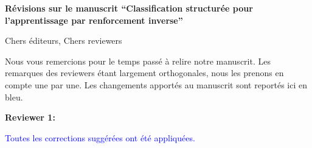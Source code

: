\documentclass[11pt, a4paper]{letter}
\begin{document}

\color{blue}

\address{Edouard Klein,  Matthieu Geist, \\Bilal Piot, Olivier Pietquin \\ IMS – MaLIS Research Group, Sup\'elec \\ 2 rue Edouard Belin, 57070 Metz (France)}
\date{Metz, \today. \vspace{1.5cm}}



\begin{letter}{\large \textbf{Révisions sur le manuscrit ``Classification structurée pour l'apprentissage par renforcement inverse''}}
\bigskip
\opening{Chers éditeurs, Chers reviewers}

\bigskip

Nous vous remercions pour le temps passé à relire notre manuscrit. Les remarques des reviewers étant largement orthogonales, nous les prenons en compte une par une. Les changements apportés au manuscrit sont reportés ici en bleu.

\newpage
\color{black}
\begin{large} \textbf{Reviewer 1:} \\ \end{large}
\textcolor{blue}{
Toutes les corrections suggérées ont été appliquées.
}


\end{letter}
\end{document}
